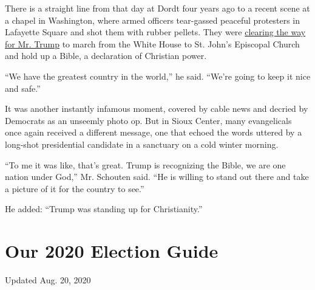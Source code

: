 There is a straight line from that day at Dordt four years ago to a
recent scene at a chapel in Washington, where armed officers tear-gassed
peaceful protesters in Lafayette Square and shot them with rubber
pellets. They were
\href{https://www.nytimes3xbfgragh.onion/2020/06/02/us/politics/trump-walk-lafayette-square.html}{clearing
the way for Mr. Trump} to march from the White House to St. John's
Episcopal Church and hold up a Bible, a declaration of Christian power.

``We have the greatest country in the world,'' he said. ``We're going to
keep it nice and safe.''

It was another instantly infamous moment, covered by cable news and
decried by Democrats as an unseemly photo op. But in Sioux Center, many
evangelicals once again received a different message, one that echoed
the words uttered by a long-shot presidential candidate in a sanctuary
on a cold winter morning.

``To me it was like, that's great. Trump is recognizing the Bible, we
are one nation under God,'' Mr. Schouten said. ``He is willing to stand
out there and take a picture of it for the country to see.''

He added: ``Trump was standing up for Christianity.''

\hypertarget{our-2020-election-guide}{%
\section{Our 2020 Election Guide}\label{our-2020-election-guide}}

Updated Aug. 20, 2020

